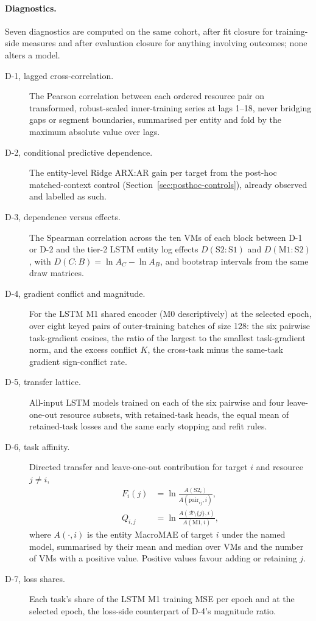 \documentclass[a4paper,fleqn]{cas-dc}
\begin{document}
\paragraph{Diagnostics.} Seven diagnostics are computed on the same cohort,
after fit closure for training-side measures and after evaluation closure for
anything involving outcomes; none alters a model.
\begin{description}
  \item[D-1, lagged cross-correlation.] The Pearson correlation between
    each
    ordered resource pair on transformed, robust-scaled inner-training series
    at lags 1--18, never bridging gaps or segment boundaries, summarised per
    entity and fold by the maximum absolute value over lags.
  \item[D-2, conditional predictive dependence.] The entity-level Ridge
    ARX:AR gain per target from the post-hoc matched-context control
    (Section~\ref{sec:posthoc-controls}), already observed and labelled as
    such.
  \item[D-3, dependence versus effects.] The Spearman correlation across the
    ten VMs of each block between D-1 or D-2 and the tier-2 LSTM entity log
    effects $D(\mathrm{S2}\!:\!\mathrm{S1})$ and
    $D(\mathrm{M1}\!:\!\mathrm{S2})$, with $D(C\!:\!B)=\ln A_C-\ln A_B$, and
    bootstrap intervals from the same draw matrices.
  \item[D-4, gradient conflict and magnitude.] For the LSTM M1 shared encoder
    (M0 descriptively) at the selected epoch, over eight keyed pairs of
    outer-training batches of size 128: the six pairwise task-gradient
    cosines, the ratio of the largest to the smallest task-gradient norm, and
    the excess conflict $K$, the cross-task minus the same-task gradient
    sign-conflict rate.
  \item[D-5, transfer lattice.] All-input LSTM models trained on each of the
    six pairwise and four leave-one-out resource subsets, with retained-task
    heads, the equal mean of retained-task losses and the same early
    stopping and refit rules.
  \item[D-6, task affinity.] Directed transfer and leave-one-out
    contribution for target $i$ and resource $j\neq i$,
    \begin{equation*}
      \begin{aligned}
        F_i(j)&=\ln\frac{A(\mathrm{S2}_i)}{A(\mathrm{pair}_{ij},i)},\\
        Q_{i,j}&=\ln\frac{A(\mathcal{R}\setminus\{j\},i)}{A(\mathrm{M1},i)},
      \end{aligned}
    \end{equation*}
    where $A(\cdot,i)$ is the entity MacroMAE of target $i$ under the named
    model, summarised by their mean and median over VMs
    and the number of VMs with a positive value. Positive values favour
    adding or retaining $j$.
  \item[D-7, loss shares.] Each task's share of the LSTM M1 training MSE per
    epoch and at the selected epoch, the loss-side counterpart of D-4's
    magnitude ratio.
\end{description}
\end{document}
